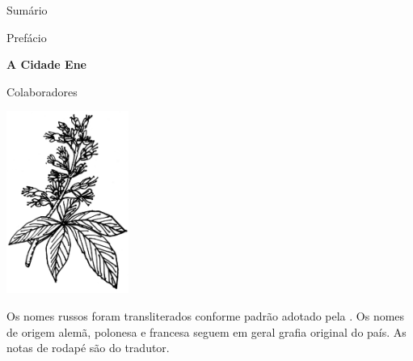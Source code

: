 \thispagestyle{empty}
\MyriadPro
Sumário

\hspace{2cm}{\footnotesize\Georgia{\pageref{prefacio}}} \hspace{.6cm} {\footnotesize{Prefácio}} 

\medskip

\hspace{2cm}{\footnotesize\Georgia{\pageref{cidade}}} \hspace{.4cm} {\footnotesize\textbf{A Cidade Ene}} 

\medskip

\hspace{2cm}{\footnotesize\Georgia{\pageref{colaboradores}}} \hspace{.28cm} {\footnotesize{Colaboradores}}

\begin{flushright}
\vfill
\includegraphics[width=4cm]{./castanha.jpg}
\end{flushright}

\pagebreak
\thispagestyle{empty}

\begin{vplace}[30]
\begin{centering}
Os nomes russos foram transliterados conforme padrão adotado pela .
Os nomes de origem alemã, polonesa e francesa seguem em geral grafia original do país.
As notas de rodapé são do tradutor.
\end{centering}
\end{vplace}
\thispagestyle{empty}